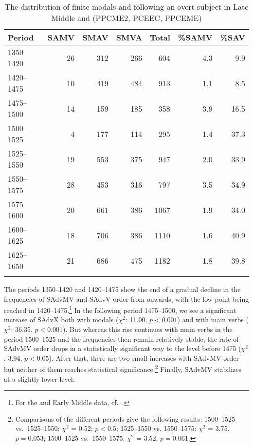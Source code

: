 \documentclass[output=paper]{langsci/langscibook}
\begin{document}
\begin{table}
\caption{The distribution of finite modals and  following an overt
    subject in Late Middle and  (PPCME2, PCEEC,
PPCEME)\label{tab:key:09.1}}
\begin{tabular}{lrrrrrr}
\lsptoprule
{Period} & {SAMV} & {SMAV} & {SMVA} & {Total} & {\%SAMV} & {\%SAV}\\
\midrule
1350--1420 & 26 & 312 & 266 & 604 & 4.3 & 9.9\\
1420--1475 & 10 & 419 & 484 & 913 & 1.1 & 8.5\\
1475--1500 & 14 & 159 & 185 & 358 & 3.9 & 16.5\\
1500--1525 & 4 & 177 & 114 & 295 & 1.4 & 37.3\\
1525--1550 & 19 & 553 & 375 & 947 & 2.0 & 33.9\\
1550--1575 & 28 & 453 & 316 & 797 & 3.5 & 34.9\\
1575--1600 & 20 & 661 & 386 & 1067 & 1.9 & 34.0\\
1600--1625 & 18 & 706 & 386 & 1110 & 1.6 & 40.9\\
1625--1650 & 21 & 686 & 475 & 1182 & 1.8 & 39.8\\
\lspbottomrule
\end{tabular}
\end{table}

The periods 1350--1420 and 1420--1475 show the end of a gradual decline in the
frequencies of SAdvMV and SAdvV order from  onwards, with the low
point being reached in 1420--1475.\footnote{For the  and Early
Middle  data, cf.\ \textcites[512]{HaeIhs2016}{HaeIhsta}.}  In the
following period 1475--1500, we see a significant increase of SAdvX both with
modals ($\chi^2$: 11.00, $p < 0.001$) and with main verbs ($\chi^2$: 36.35, $p
< 0.001$). But whereas this rise continues with main verbs in the period
1500--1525 and the frequencies then remain relatively stable, the rate of SAdvMV
order drops in a statistically significant way to the level before 1475
($\chi^2$: 3.94, $p < 0.05$). After that, there are two small increases with
SAdvMV order but neither of them reaches statistical
significance.\footnote{Comparisons of the different periods give the following
    results: 1500--1525 vs.\ 1525--1550: $\chi^2$ = 0.52; $p < 0.5$; 1525--1550 vs.
    1550--1575: $\chi^2$ = 3.75, $p = 0.053$; 1500--1525 vs.\  1550--1575:
$\chi^2$ = 3.52, $p = 0.061$.} Finally, SAdvMV stabilizes at a slightly lower
level.
\end{document}
